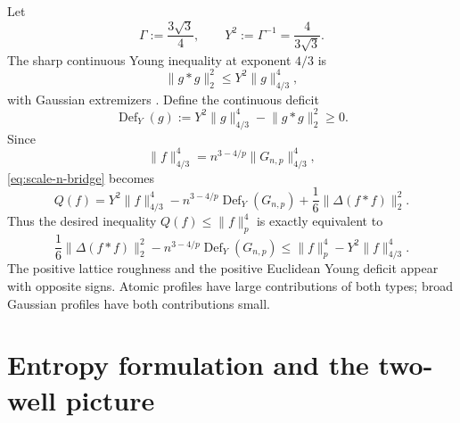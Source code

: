 \documentclass[11pt,reqno]{amsart}
\numberwithin{equation}{section}
\theoremstyle{definition}
\theoremstyle{remark}
\newcommand{\norm}[1]{\lVert #1\rVert}
\newcommand{\Def}{\operatorname{Def}}
\begin{document}
Let
\begin{equation}\label{eq:GammaY}
  \Gamma:=\frac{3\sqrt3}{4},
  \qquad
  Y^2:=\Gamma^{-1}=\frac4{3\sqrt3}.
\end{equation}
The sharp continuous Young inequality at exponent $4/3$ is
\begin{equation}\label{eq:continuous-young}
  \norm{g*g}_2^2\le Y^2\norm g_{4/3}^4,
\end{equation}
with Gaussian extremizers \cite{Beckner1975,BrascampLieb1976}.  Define the
continuous deficit
\begin{equation}\label{eq:young-deficit}
  \Def_Y(g):=Y^2\norm g_{4/3}^4-\norm{g*g}_2^2\ge0.
\end{equation}
Since
\[
  \norm f_{4/3}^4
  =n^{3-4/p}\norm{G_{n,p}}_{4/3}^4,
\]
\eqref{eq:scale-n-bridge} becomes
\begin{equation}\label{eq:compensated-identity}
  \boxed{
  Q(f)
  =Y^2\norm f_{4/3}^4
   -n^{3-4/p}\Def_Y(G_{n,p})
   +\frac16\norm{\Delta(f*f)}_2^2.}
\end{equation}
Thus the desired inequality $Q(f)\le\norm f_p^4$ is exactly equivalent to
\begin{equation}\label{eq:compensated-deficit}
  \frac16\norm{\Delta(f*f)}_2^2
  -n^{3-4/p}\Def_Y(G_{n,p})
  \le \norm f_p^4-Y^2\norm f_{4/3}^4.
\end{equation}
The positive lattice roughness and the positive Euclidean Young deficit
appear with opposite signs.  Atomic profiles have large contributions of
both types; broad Gaussian profiles have both contributions small.

\section{Entropy formulation and the two-well picture}
\end{document}
